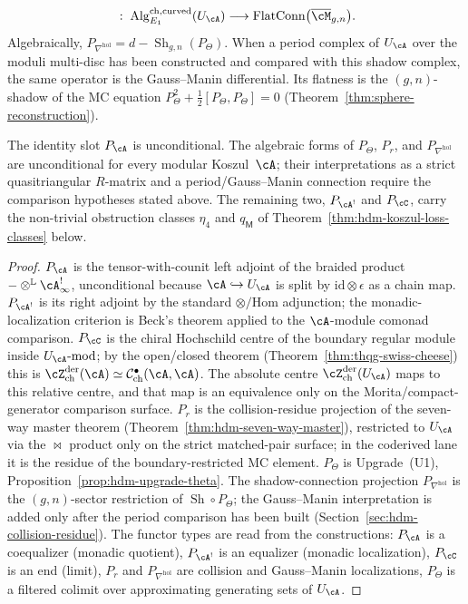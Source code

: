 \begin{theorem}
\begin{enumerate}[label=\textup{(P\arabic*)}]
\[\;:\;\mathrm{Alg}_{E_1}^{\mathrm{ch,curved}}(U_\cA)\longrightarrow
\mathrm{FlatConn}\bigl(\overline{\cM}_{g,n}\bigr).
\]
Algebraically,
$P_{\nabla^{\mathrm{hol}}}=d-\operatorname{Sh}_{g,n}(P_\Theta)$.
When a period complex of $U_\cA$ over the moduli multi-disc has been
constructed and compared with this shadow complex, the same operator is
the Gauss--Manin differential. Its flatness is the $(g,n)$-shadow of
the MC equation
$P_\Theta^2+\tfrac12[P_\Theta,P_\Theta]=0$
\textup{(}Theorem~\textup{\ref{thm:sphere-reconstruction}}\textup{)}.
\end{enumerate}
The identity slot $P_\cA$ is unconditional. The algebraic forms of
$P_\Theta$, $P_r$, and $P_{\nabla^{\mathrm{hol}}}$ are unconditional
for every modular Koszul~$\cA$; their interpretations as a strict
quasitriangular $R$-matrix and a period/Gauss--Manin connection
require the comparison hypotheses stated above. The remaining two,
$P_{\cA^!}$ and $P_\cC$, carry the non-trivial obstruction classes
$\eta_4$ and $q_\mathsf{M}$ of
Theorem~\ref{thm:hdm-koszul-loss-classes} below.
\end{theorem}

\begin{proof}
$P_\cA$ is the tensor-with-counit left adjoint of the braided product
$-\otimes^{\mathbb L}\cA^!_\infty$, unconditional because
$\cA\hookrightarrow U_\cA$ is split by $\mathrm{id}\otimes\epsilon$
as a chain map. $P_{\cA^!}$ is its right adjoint by the standard
$\otimes/\mathrm{Hom}$ adjunction; the monadic-localization criterion is
Beck's theorem applied to the $\cA$-module comonad comparison.
$P_\cC$ is the chiral Hochschild centre of the boundary regular module
inside $U_\cA\text{-}\mathrm{mod}$; by the open/closed theorem
(Theorem~\ref{thm:thqg-swiss-cheese}) this is
$\cZ^{\mathrm{der}}_{\mathrm{ch}}(\cA)
\simeq\mathcal C^\bullet_{\mathrm{ch}}(\cA,\cA)$. The absolute centre
$\cZ^{\mathrm{der}}_{\mathrm{ch}}(U_\cA)$ maps to this relative centre,
and that map is an equivalence only on the Morita/compact-generator
comparison surface. $P_r$ is the
collision-residue projection of the seven-way master theorem
(Theorem~\ref{thm:hdm-seven-way-master}), restricted to $U_\cA$ via
the $\bowtie$ product only on the strict matched-pair surface; in the
coderived lane it is the residue of the boundary-restricted MC element.
$P_\Theta$ is Upgrade~(U1),
Proposition~\ref{prop:hdm-upgrade-theta}. The shadow-connection
projection $P_{\nabla^{\mathrm{hol}}}$ is the $(g,n)$-sector
restriction of $\operatorname{Sh}\circ P_\Theta$; the Gauss--Manin
interpretation is added only after the period comparison has been built
(Section~\ref{sec:hdm-collision-residue}). The functor types are
read from the constructions: $P_\cA$ is a coequalizer (monadic
quotient), $P_{\cA^!}$ is an equalizer (monadic localization),
$P_\cC$ is an end (limit), $P_r$ and $P_{\nabla^{\mathrm{hol}}}$ are
collision and Gauss--Manin localizations, $P_\Theta$ is a filtered
colimit over approximating generating sets of $U_\cA$.
\end{proof}

